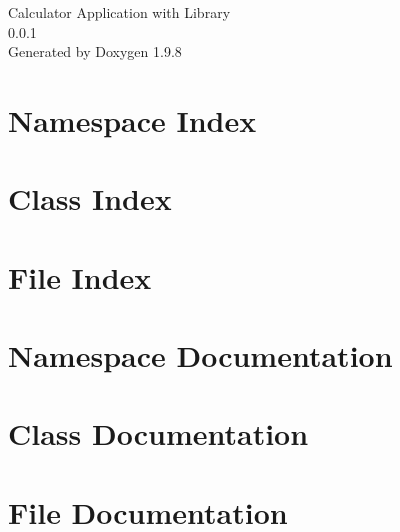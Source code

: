 \documentclass[twoside]{book}
\newcommand{\+}{\discretionary{\mbox{\scriptsize$\hookleftarrow$}}{}{}}
\newcommand{\clearemptydoublepage}{%
    \newpage{\pagestyle{empty}\cleardoublepage}%
  }
\begin{document}
  \raggedbottom
    \hypersetup{pageanchor=false,
                bookmarksnumbered=true,
                pdfencoding=unicode
               }
  \begin{titlepage}
  \vspace*{7cm}
  \begin{center}%
  {\Large Calculator Application with Library}\\
  [1ex]\large 0.\+0.\+1 \\
  \vspace*{1cm}
  {\large Generated by Doxygen 1.9.8}\\
  \end{center}
  \end{titlepage}
  \clearemptydoublepage
  \tableofcontents
  \clearemptydoublepage
  \hypersetup{pageanchor=true}
\chapter{Namespace Index}

\chapter{Class Index}

\chapter{File Index}

\chapter{Namespace Documentation}

\chapter{Class Documentation}


\chapter{File Documentation}




  \backmatter
  \newpage
  \clearemptydoublepage
  \printindex
\end{document}
